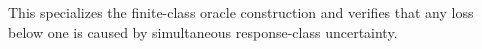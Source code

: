 This specializes the finite-class oracle construction and verifies that any loss below one is caused by simultaneous response-class uncertainty.